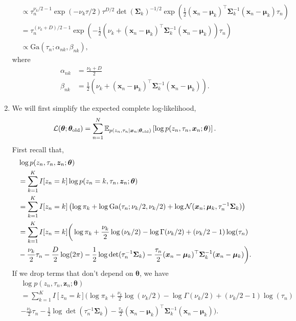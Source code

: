 \begin{enumerate}[label = (\alph*)]
\begin{align*}
        &\propto \tau_n^{\nu_k/2 - 1}\exp\left(-\nu_k\tau/2\right)\tau^{D/2}\det(\bm{\Sigma}_k)^{-1/2}\exp\left(\frac{1}{2}(\bm{x}_n-\bm{\mu}_k)^\top\bm{\Sigma}_k^{-1}(\bm{x}_n - \bm{\mu}_k)\tau_n\right)\\
        &=\tau_n^{(\nu_k+D)/2 - 1}\exp\left(-\frac{1}{2}\left(\nu_k + (\bm{x}_n-\bm{\mu}_k)^\top\bm{\Sigma}_k^{-1}(\bm{x}_n - \bm{\mu}_k)\right)\tau_n\right)\\
        &\propto \mathrm{Ga}(\tau_n; \alpha_{nk},\beta_{nk}),
    \end{align*}
    where
    \begin{align*}
        \alpha_{nk}&=\frac{\nu_k+D}{2}\\
        \beta_{nk}&=\frac{1}{2}\left(\nu_k + (\bm{x}_n-\bm{\mu}_k)^\top\bm{\Sigma}_k^{-1}(\bm{x}_n - \bm{\mu}_k)\right).
    \end{align*}
    \item We will first simplify the expected complete log-likelihood,
    \[\mathcal{L}(\bm{\theta};\bm{\theta}_{\mathrm{old}}) = \sum_{n=1}^N {\mathbb E}_{p(z_n, \tau_n \mid \bm{x}_n;\bm{\theta}_{\mathrm{old}})}\left[\log p(z_n,\tau_n,\bm{x}_n;\bm{\theta})\right]. \]
    First recall that,
    \begin{align*}
        &\log p(z_n,\tau_n,\bm{z}_n;\bm{\theta})\\
        &=\sum_{k=1}^K I[z_n = k]\log p(z_n = k,\tau_n,\bm{z}_n;\bm{\theta})\\
        &=\sum_{k=1}^K I[z_n = k]\left(\log \pi_k + \log \mathrm{Ga}(\tau_n;\nu_k/2,\nu_k/2) + \log {\mathcal N}(\bm{x}_n; \bm{\mu}_k, \tau_n^{-1}\bm{\Sigma}_k)\right)\\
        &=\sum_{k=1}^K I[z_n = k]\bigg(\log \pi_k + \frac{\nu_k}{2}\log\left(\nu_k/2\right) - \log \Gamma(\nu_k/2) + (\nu_k/2-1)\log(\tau_n)\\
        & - \frac{\nu_k}{2}\tau_n- \frac{D}{2}\log(2\pi) -\frac{1}{2}\log \det(\tau_n^{-1}\bm{\Sigma}_k) - \frac{\tau_n}{2}(\bm{x}_n - \bm{\mu}_k)^\top \bm{\Sigma}_k^{-1}(\bm{x}_n - \bm{\mu}_k) \bigg).
    \end{align*}
    If we drop terms that don't depend on $\bm{\theta}$, we have
    \begin{align}
        &\log p(z_n,\tau_n,\bm{z}_n;\bm{\theta})\nonumber \\
        &=\sum_{k=1}^K I[z_n = k]\bigg(\log \pi_k + \frac{\nu_k}{2}\log\left(\nu_k/2\right) - \log \Gamma(\nu_k/2) + (\nu_k/2-1)\log(\tau_n)\nonumber \\
        & - \frac{\nu_k}{2}\tau_n -\frac{1}{2}\log \det(\tau_n^{-1}\bm{\Sigma}_k) - \frac{\tau_n}{2}(\bm{x}_n - \bm{\mu}_k)^\top \bm{\Sigma}_k^{-1}(\bm{x}_n - \bm{\mu}_k) \bigg).\label{eq:2022 Q5 log like}

\end{align}
\end{enumerate}
